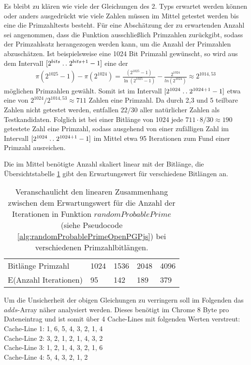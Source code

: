 Es bleibt zu klären wie viele der Gleichungen des 2. Typs erwartet werden können oder anders ausgedrückt wie viele Zahlen müssen im Mittel getestet werden bis eine die Primzahltests besteht. 
Für eine Abschätzung der zu erwartenden Anzahl sei angenommen, dass die Funktion ausschließlich Primzahlen zurückgibt, sodass der Primzahlsatz herangezogen werden kann, um die Anzahl der Primzahlen abzuschätzen.
Ist beispielsweise eine 1024 Bit Primzahl gewünscht, so wird aus dem Intervall $[2^{bits}\mathrel{{.}\,{.}}\nobreak 2^{bits+1}-1]$ eine der \begin{align}
\pi(2^{1025}-1) - \pi(2^{1024}) = \frac{(2^{1025}-1)}{\ln(2^{1025}-1)} - \frac{2^{1024}}{ln(2^{1024})} \approx 2^{1014,53}
\end{align}
möglichen Primzahlen gewählt.
Somit ist im Intervall $[2^{1024}\mathrel{{.}\,{.}}\nobreak 2^{1024+1}-1]$ etwa eine von $2^{1024}/2^{1014,53} \approx 711$ Zahlen eine Primzahl.
Da durch 2,3 und 5 teilbare Zahlen nicht getestet werden, entfallen $22/30$  aller natürlicher Zahlen als Testkandidaten.
Folglich ist bei einer Bitlänge von 1024 jede $711 \cdot 8/30 \approx 190$ getestete Zahl eine Primzahl, sodass ausgehend von einer zufälligen Zahl im Intervall $[2^{1024}\mathrel{{.}\,{.}}\nobreak 2^{1024+1}-1]$ im Mittel etwa 95 Iterationen zum Fund einer Primzahl ausreichen.

Die im Mittel benötigte Anzahl skaliert linear mit der Bitlänge, die Übersichtstabelle \ref{tbl:bitLengthNumberOfIterations} gibt den Erwartungswert für verschiedene Bitlängen an.
\begin{table}[h]
\label{tbl:bitLengthNumberOfIterations}
\caption{Veranschaulicht den linearen Zusammenhang zwischen dem Erwartungswert für die Anzahl der Iterationen in Funktion $randomProbablePrime$ (siehe Pseudocode \ref{alg:randomProbablePrimeOpenPGPjs}) bei verschiedenen Primzahlbitlängen.}
\begin{tabular}{lllll}
Bitlänge Primzahl     & 1024 & 1536 & 2048 & 4096 \\
E(Anzahl Iterationen) & 95   & 142  & 189  & 379 
\end{tabular}
\end{table}

Um die Unsicherheit der obigen Gleichungen zu verringern soll im Folgenden das $adds$-Array näher analysiert werden.
Dieses benötigt im Chrome 8 Byte pro Dateneintrag und ist somit über 4 Cache-Lines mit folgenden Werten verstreut:\\
Cache-Line 1: 1, 6, 5, 4, 3, 2, 1, 4\\
Cache-Line 2: 3, 2, 1, 2, 1, 4, 3, 2\\
Cache-Line 3: 1, 2, 1, 4, 3, 2, 1, 6\\
Cache-Line 4: 5, 4, 3, 2, 1, 2

